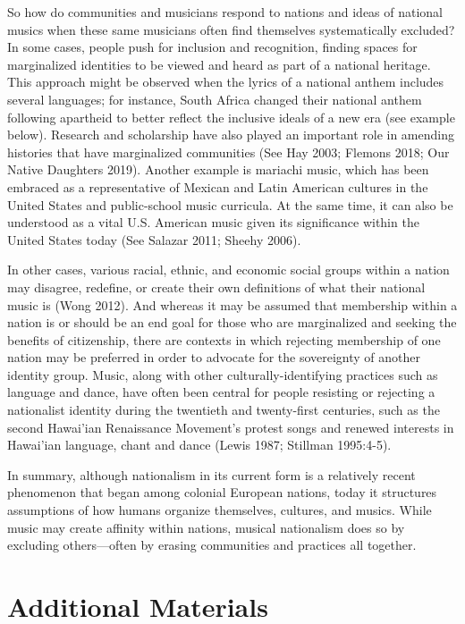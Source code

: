 \documentclass[twoside]{article}
\begin{document}
So how do communities and musicians respond to nations and ideas of
national musics when these same musicians often find themselves
systematically excluded? In some cases, people push for inclusion and
recognition, finding spaces for marginalized identities to be viewed and
heard as part of a national heritage. This approach might be observed
when the lyrics of a national anthem includes several languages; for
instance, South Africa changed their national anthem following apartheid
to better reflect the inclusive ideals of a new era (see example below).
Research and scholarship have also played an important role in amending
histories that have marginalized communities (See Hay 2003; Flemons
2018; Our Native Daughters 2019). Another example is mariachi music,
which has been embraced as a representative of Mexican and Latin
American cultures in the United States and public-school music
curricula. At the same time, it can also be understood as a vital U.S.
American music given its significance within the United States today
(See Salazar 2011; Sheehy 2006).

In other cases, various racial, ethnic, and economic social groups
within a nation may disagree, redefine, or create their own definitions
of what their national music is (Wong 2012). And whereas it may be
assumed that membership within a nation is or should be an end goal for
those who are marginalized and seeking the benefits of citizenship,
there are contexts in which rejecting membership of one nation may be
preferred in order to advocate for the sovereignty of another identity
group. Music, along with other culturally-identifying practices such as
language and dance, have often been central for people resisting or
rejecting a nationalist identity during the twentieth and twenty-first
centuries, such as the second Hawai'ian Renaissance Movement's protest
songs and renewed interests in Hawai'ian language, chant and dance
(Lewis 1987; Stillman 1995:4-5).

In summary, although nationalism in its current form is a relatively
recent phenomenon that began among colonial European nations, today it
structures assumptions of how humans organize themselves, cultures, and
musics. While music may create affinity within nations, musical
nationalism does so by excluding others---often by erasing communities
and practices all together.

\hypertarget{additional-materials}{%
\section*{Additional Materials}\label{additional-materials}}
\end{document}
